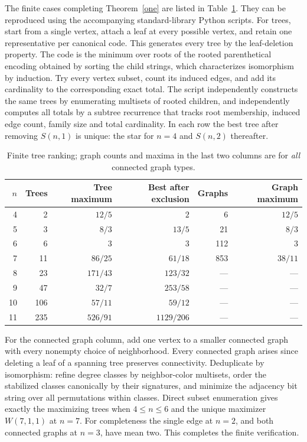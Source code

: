 \documentclass[11pt,a4paper]{article}
\begin{document}
The finite cases completing Theorem~\ref{one} are listed in Table~\ref{tab}. They can be reproduced using the accompanying standard-library Python scripts. For trees, start from a single vertex, attach a leaf at every possible vertex, and retain one representative per canonical code. This generates every tree by the leaf-deletion property. The code is the minimum over roots of the rooted parenthetical encoding obtained by sorting the child strings, which characterizes isomorphism by induction. Try every vertex subset, count its induced edges, and add its cardinality to the corresponding exact total. The script independently constructs the same trees by enumerating multisets of rooted children, and independently computes all totals by a subtree recurrence that tracks root membership, induced edge count, family size and total cardinality. In each row the best tree after removing $S(n,1)$ is unique: the star for $n=4$ and $S(n,2)$ thereafter.
\begin{table}[ht]\centering\small
\caption{Finite tree ranking; graph counts and maxima in the last two columns are for \emph{all} connected graph types.}\label{tab}
\begin{tabular}{@{}rrrrrr@{}}
\toprule
$n$ & Trees & Tree maximum & Best after exclusion & Graphs & Graph maximum\\
\midrule
4&2&$12/5$&$2$&6&$12/5$\\
5&3&$8/3$&$13/5$&21&$8/3$\\
6&6&$3$&$3$&112&$3$\\
7&11&$86/25$&$61/18$&853&$38/11$\\
8&23&$171/43$&$123/32$&---&---\\
9&47&$32/7$&$253/58$&---&---\\
10&106&$57/11$&$59/12$&---&---\\
11&235&$526/91$&$1129/206$&---&---\\
\bottomrule
\end{tabular}
\end{table}

For the connected graph column, add one vertex to a smaller connected graph with every nonempty choice of neighborhood. Every connected graph arises since deleting a leaf of a spanning tree preserves connectivity. Deduplicate by isomorphism: refine degree classes by neighbor-color multisets, order the stabilized classes canonically by their signatures, and minimize the adjacency bit string over all permutations within classes. Direct subset enumeration gives exactly the maximizing trees when $4\le n\le6$ and the unique maximizer $W(7,1,1)$ at $n=7$. For completeness the single edge at $n=2$, and both connected graphs at $n=3$, have mean two. This completes the finite verification.
\end{document}
